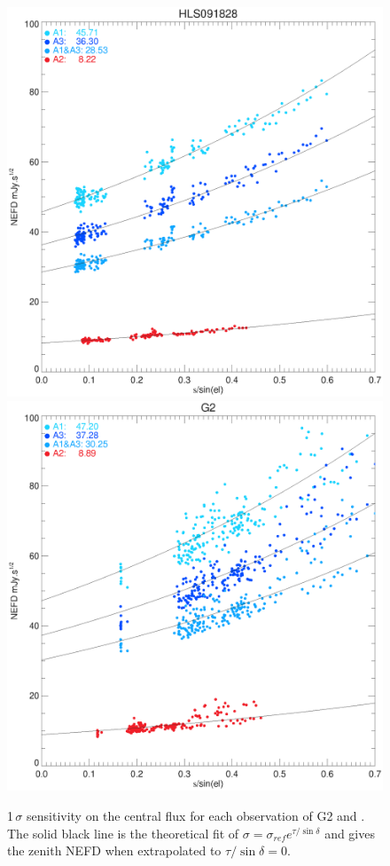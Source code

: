 \begin{figure}[hhh]
\begin{center}
\includegraphics[clip, angle=0, scale =0.42]{Figures/hls_NEFD_vs_TauElev_all.eps}
\includegraphics[clip, angle=0, scale =0.42]{Figures/g2_NEFD_vs_TauElev_all.eps}
\caption[NEFD per scan]{1\,$\sigma$ sensitivity on the central flux for each
  observation of G2 and \hls. The solid black line is the theoretical fit of
  $\sigma = \sigma_{ref}e^{\tau/\sin\delta}$ and gives the zenith NEFD when
  extrapolated to $\tau/\sin\delta = 0$.}
\label{fig:nefd_scatter}
\end{center}
\end{figure}

